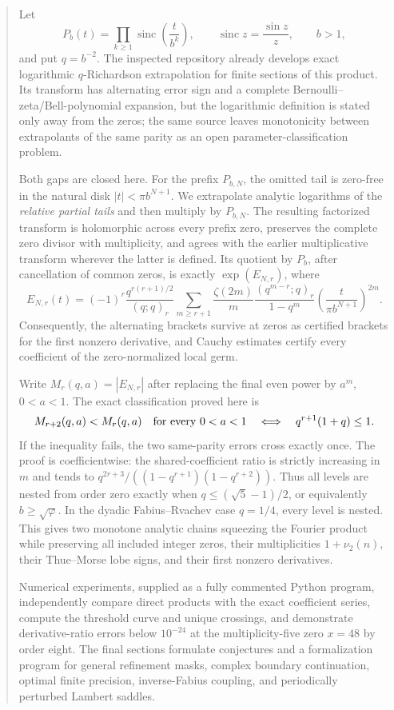 \documentclass[11pt,oneside]{article}
\numberwithin{equation}{section}
\theoremstyle{frontier}
\theoremstyle{definition}
\theoremstyle{remark}
\newcommand{\sinc}{\operatorname{sinc}}
\begin{document}
\begin{abstract}
Let
\[
 P_b(t)=\prod_{k\ge1}\sinc\!\left(\frac{t}{b^k}\right),
 \qquad \sinc z=\frac{\sin z}{z},\qquad b>1,
\]
and put $q=b^{-2}$.  The inspected repository already develops exact logarithmic
$q$-Richardson extrapolation for finite sections of this product.  Its transform has
alternating error sign and a complete Bernoulli--zeta/Bell-polynomial expansion, but the
logarithmic definition is stated only away from the zeros; the same source leaves
monotonicity between extrapolants of the same parity as an open parameter-classification
problem.

Both gaps are closed here.  For the prefix $P_{b,N}$, the omitted tail is zero-free in the
natural disk $|t|<\pi b^{N+1}$.  We extrapolate analytic logarithms of the \emph{relative
partial tails} and then multiply by $P_{b,N}$.  The resulting factorized transform is
holomorphic across every prefix zero, preserves the complete zero divisor with
multiplicity, and agrees with the earlier multiplicative transform wherever the latter is
defined.  Its quotient by $P_b$, after cancellation of common zeros, is exactly
$\exp(E_{N,r})$, where
\[
 E_{N,r}(t)=(-1)^r\frac{q^{r(r+1)/2}}{(q;q)_r}
 \sum_{m\ge r+1}\frac{\zeta(2m)}{m}
 \frac{(q^{m-r};q)_r}{1-q^m}
 \left(\frac{t}{\pi b^{N+1}}\right)^{2m}.
\]
Consequently, the alternating brackets survive at zeros as certified brackets for the first
nonzero derivative, and Cauchy estimates certify every coefficient of the zero-normalized
local germ.

Write $M_r(q,a)=|E_{N,r}|$ after replacing the final even power by $a^m$, $0<a<1$.
The exact classification proved here is
\[
 M_{r+2}(q,a)<M_r(q,a)\quad\hbox{for every }0<a<1
 \quad\Longleftrightarrow\quad q^{r+1}(1+q)\le1.
\]
If the inequality fails, the two same-parity errors cross exactly once.  The proof is
coefficientwise: the shared-coefficient ratio is strictly increasing in $m$ and tends to
$q^{2r+3}/((1-q^{r+1})(1-q^{r+2}))$.  Thus all levels are nested from order zero exactly
when $q\le(\sqrt5-1)/2$, or equivalently $b\ge\sqrt\varphi$.  In the dyadic Fabius--Rvachev
case $q=1/4$, every level is nested.  This gives two monotone analytic chains squeezing the
Fourier product while preserving all included integer zeros, their multiplicities
$1+\nu_2(n)$, their Thue--Morse lobe signs, and their first nonzero derivatives.

Numerical experiments, supplied as a fully commented Python program, independently compare
direct products with the exact coefficient series, compute the threshold curve and unique
crossings, and demonstrate derivative-ratio errors below $10^{-24}$ at the multiplicity-five
zero $x=48$ by order eight.  The final sections formulate conjectures and a formalization
program for general refinement masks, complex boundary continuation, optimal finite
precision, inverse-Fabius coupling, and periodically perturbed Lambert saddles.
\end{abstract}
\end{document}
